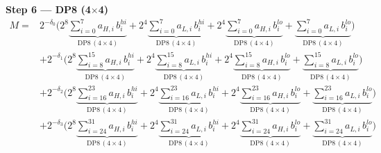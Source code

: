 \documentclass[fleqn]{article}
\newcommand{\DPop}[3]{\mathrm{DP#1}\,(#2\!\times\!#3)}
\begin{document}
\textbf{Step 6 --- DP8 (4$\times$4)}
\begin{align*}
M = {}
  & 2^{-\delta_0}\Big( 2^{8}\underbrace{\sum_{i=0}^{7} a_{H,i}\, b_i^{hi}}_{\DPop{8}{4}{4}}
  + 2^{4}\underbrace{\sum_{i=0}^{7} a_{L,i}\, b_i^{hi}}_{\DPop{8}{4}{4}}
  + 2^{4}\underbrace{\sum_{i=0}^{7} a_{H,i}\, b_i^{lo}}_{\DPop{8}{4}{4}}
  + \underbrace{\sum_{i=0}^{7} a_{L,i}\, b_i^{lo}}_{\DPop{8}{4}{4}} \Big) \\[0.15em]
  & + 2^{-\delta_1}\Big( 2^{8}\underbrace{\sum_{i=8}^{15} a_{H,i}\, b_i^{hi}}_{\DPop{8}{4}{4}}
  + 2^{4}\underbrace{\sum_{i=8}^{15} a_{L,i}\, b_i^{hi}}_{\DPop{8}{4}{4}}
  + 2^{4}\underbrace{\sum_{i=8}^{15} a_{H,i}\, b_i^{lo}}_{\DPop{8}{4}{4}}
  + \underbrace{\sum_{i=8}^{15} a_{L,i}\, b_i^{lo}}_{\DPop{8}{4}{4}} \Big) \\[0.15em]
  & + 2^{-\delta_2}\Big( 2^{8}\underbrace{\sum_{i=16}^{23} a_{H,i}\, b_i^{hi}}_{\DPop{8}{4}{4}}
  + 2^{4}\underbrace{\sum_{i=16}^{23} a_{L,i}\, b_i^{hi}}_{\DPop{8}{4}{4}}
  + 2^{4}\underbrace{\sum_{i=16}^{23} a_{H,i}\, b_i^{lo}}_{\DPop{8}{4}{4}}
  + \underbrace{\sum_{i=16}^{23} a_{L,i}\, b_i^{lo}}_{\DPop{8}{4}{4}} \Big) \\[0.15em]
  & + 2^{-\delta_3}\Big( 2^{8}\underbrace{\sum_{i=24}^{31} a_{H,i}\, b_i^{hi}}_{\DPop{8}{4}{4}}
  + 2^{4}\underbrace{\sum_{i=24}^{31} a_{L,i}\, b_i^{hi}}_{\DPop{8}{4}{4}}
  + 2^{4}\underbrace{\sum_{i=24}^{31} a_{H,i}\, b_i^{lo}}_{\DPop{8}{4}{4}}
  + \underbrace{\sum_{i=24}^{31} a_{L,i}\, b_i^{lo}}_{\DPop{8}{4}{4}} \Big)
\end{align*}
\end{document}
